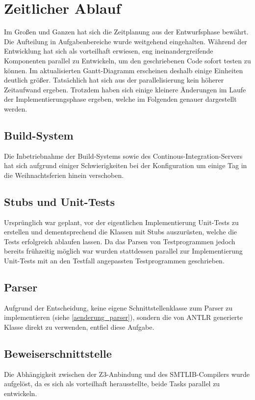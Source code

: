 \section{Zeitlicher Ablauf}

Im Großen und Ganzen hat sich die Zeitplanung aus der Entwurfsphase bewährt. Die Aufteilung in Aufgabenbereiche wurde weitgehend eingehalten. Während der Entwicklung hat sich als vorteilhaft erwiesen, eng ineinandergreifende Komponenten parallel zu Entwickeln, um den geschriebenen Code sofort testen zu können. Im aktualisierten Gantt-Diagramm erscheinen deshalb einige Einheiten deutlich größer. Tatsächlich hat sich aus der parallelisierung kein höherer Zeitaufwand ergeben. Trotzdem haben sich einige kleinere Änderungen im Laufe der Implementierungsphase ergeben, welche im Folgenden genauer dargestellt werden.

\subsection{Build-System}
Die Inbetriebnahme der Build-Systems sowie des Continous-Integration-Servers hat sich aufgrund einiger Schwierigkeiten bei der Konfiguration um einige Tag in die Weihnachtsferien hinein verschoben.

\subsection{Stubs und Unit-Tests}
Ursprünglich war geplant, vor der eigentlichen Implementierung Unit-Tests zu erstellen und dementsprechend die Klassen mit Stubs auszurüsten, welche die Tests erfolgreich ablaufen lassen. Da das Parsen von Testprogrammen jedoch bereits frühzeitig möglich war wurden stattdessen parallel zur Implementierung Unit-Tests mit an den Testfall angepassten Testprogrammen geschrieben.

\subsection{Parser}
Aufgrund der Entscheidung, keine eigene Schnittstellenklasse zum Parser zu implementieren (siehe \ref{aenderung_parser}), sondern die von ANTLR generierte Klasse direkt zu verwenden, entfiel diese Aufgabe.

\subsection{Beweiserschnittstelle}
Die Abhängigkeit zwischen der Z3-Anbindung und des SMTLIB-Compilers wurde aufgelöst, da es sich als vorteilhaft herausstellte, beide Tasks parallel zu entwickeln.

